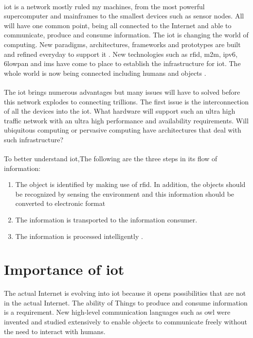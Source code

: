 \documentclass[12pt,a4paper,final]{report}
\begin{document}
\paragraph{}
\gls{iot} is a network mostly ruled my machines, from the most powerful supercomputer and mainframes to the smallest devices such as sensor nodes. All will have one common point, being all connected to the Internet and able to communicate, produce and consume information. The \gls{iot} is changing the world of computing. New paradigms, architectures, frameworks and prototypes are built and refined everyday to support it \cite{ref15}. New technologies such as \gls{rfid}, \gls{m2m}, \gls{ipv6}, \gls{6lowpan} and \gls{ims} have come to place to establish the infrastructure for \gls{iot}. The whole world is now being connected including humans and objects \cite{ref18}.
\paragraph{}
The \gls{iot} brings numerous advantages but many issues will have to solved before this network explodes to connecting trillions. The first issue is the interconnection of all the devices into the \gls{iot}. What hardware will support such an ultra high traffic network with an ultra high performance and availability requirements. Will ubiquitous computing or pervasive computing have architectures that deal with such infrastructure?
\paragraph{}
To better understand \gls{iot},The following are the three steps in its flow of information:
\begin{enumerate}
\item The object is identified by making use of \gls{rfid}. In addition, the objects should be recognized by sensing the environment and this information should be converted to electronic format
\item  The information is transported to the information consumer.
\item The information is processed intelligently \cite{ref17}.
\end{enumerate}

\section{Importance of \gls{iot}}
\paragraph{}
The actual Internet is evolving into \gls{iot} because it opens possibilities that are not in the actual Internet. The ability of Things to produce and consume information is a requirement. New high-level communication languages such as \gls{owl} were invented and studied extensively to enable objects to communicate freely without the need to interact with humans.
\end{document}
